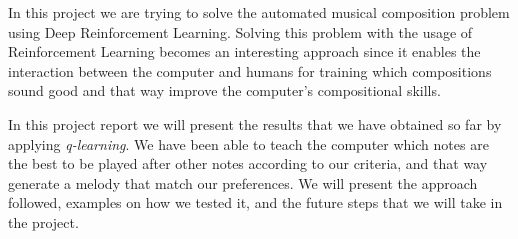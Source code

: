 In this project we are trying to solve the automated musical composition problem using Deep Reinforcement Learning. Solving this problem with the usage of Reinforcement Learning becomes an interesting approach since it enables the interaction between the computer and humans for training which compositions sound good and that way improve the computer's compositional skills.

In this project report we will present the results that we have obtained so far by applying \emph{q-learning}. We have been able to teach the computer which notes are the best to be played after other notes according to our criteria, and that way generate a melody that match our preferences. We will present the approach followed, examples on how we tested it, and the future steps that we will take in the project.